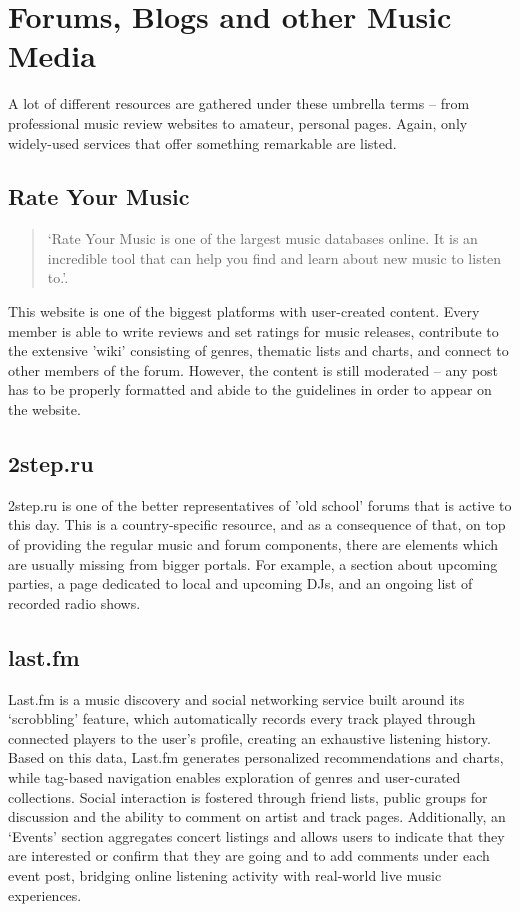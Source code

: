 \section{Forums, Blogs and other Music Media}
A lot of different resources are gathered under these umbrella terms -- from professional music review websites to
amateur, personal pages. Again, only widely-used services that offer something remarkable are listed.

\subsection{Rate Your Music}

\begin{quote}
    `Rate Your Music is one of the largest music databases online. It is an incredible tool that
    can help you find and learn about new music to listen to.'\cite{ryt}.\\
\end{quote}
This website is one of the biggest platforms with user-created content.
Every member is able to write reviews and set ratings for music releases,
contribute to the extensive 'wiki' consisting of genres, thematic lists and charts,
and connect to other members of the forum. However, the content is still moderated -- any post has
to be properly formatted and abide to the guidelines in order to appear on the website.

\subsection{2step.ru}
2step.ru is one of the better representatives of 'old school' forums that is active to this day.
This is a country-specific resource, and as a consequence of that,
on top of providing the regular music and forum components, there are elements which are usually missing
from bigger portals. For example, a section about upcoming parties,
a page dedicated to local and upcoming DJs, and an ongoing list of recorded radio shows.\cite{2step}


\subsection{last.fm}
Last.fm is a music discovery and social networking service built around its ‘scrobbling’ feature,
which automatically records every track played through connected players to the user’s profile,
creating an exhaustive listening history\cite{lastfm}.
Based on this data, Last.fm generates personalized recommendations and charts,
while tag-based navigation enables exploration of genres and user-curated collections\cite{lastfm_tags}.
Social interaction is fostered through friend lists, public groups for discussion and the ability to comment
on artist and track pages. Additionally, an `Events' section aggregates concert listings and allows users to
indicate that they are interested or confirm that they are going and to add comments under each event post,
bridging online listening activity with real-world live music experiences\cite{lastfm_events}.

